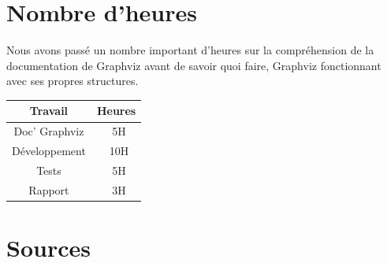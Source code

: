 \documentclass[12pt,a4paper]{report}
\begin{document}
\section{Nombre d'heures}
Nous avons pass\'{e} un nombre important d'heures sur la compr\'{e}hension de la documentation de Graphviz avant de savoir quoi faire, Graphviz fonctionnant avec ses propres structures.

\begin{tabular}{|c|c|}
  \hline
  Travail & Heures \\
  \hline
  Doc' Graphviz & ~5H \\
  \hline
  D\'{e}veloppement	&	~10H \\
  \hline
  Tests	&	~5H \\ 
  \hline
  Rapport	&	~3H \\
  \hline
\end{tabular}

\section{Sources}
\end{document}
